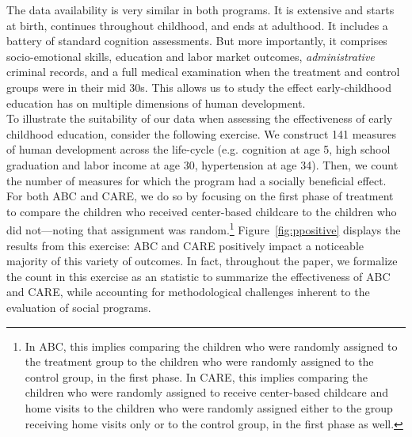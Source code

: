\noindent The data availability is very similar in both programs. It is extensive and starts at birth, continues throughout childhood, and ends at adulthood. It includes a battery of standard cognition assessments. But more importantly, it comprises socio-emotional skills, education and labor market outcomes, \textit{administrative} criminal records, and a full medical examination when the treatment and control groups were in their mid 30s. This allows us to study the effect early-childhood education has on multiple dimensions of human development.\\

\noindent To illustrate the suitability of our data when assessing the effectiveness of early childhood education, consider the following exercise. We construct 141 measures of human development across the life-cycle (e.g. cognition at age 5, high school graduation and labor income at age 30, hypertension at age 34). Then, we count the number of measures for which the program had a socially beneficial effect. For both ABC and CARE, we do so by focusing on the first phase of treatment to compare the children who received center-based childcare to the children who did not---noting that assignment was random.\footnote{In ABC, this implies comparing the children who were randomly assigned to the treatment group to the children who were randomly assigned to the control group, in the first phase. In CARE, this implies comparing the children who were randomly assigned to receive center-based childcare and home visits to the children who were randomly assigned either to the group receiving home visits only or to the control group, in the first phase as well.} Figure~\ref{fig:ppositive} displays the results from this exercise: ABC and CARE positively impact a noticeable majority of this variety of outcomes. In fact, throughout the paper, we formalize the count in this exercise as an statistic to summarize the effectiveness of ABC and CARE, while accounting for methodological challenges inherent to the evaluation of social programs.

